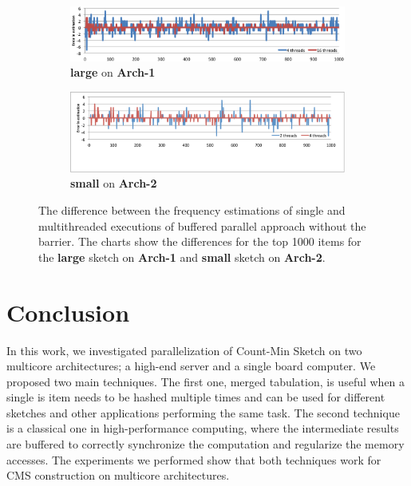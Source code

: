 \documentclass[10pt, conference, compsocconf]{IEEEtran}
\begin{document}
\begin{figure}[htbp]
\begin{center}
\begin{subfigure}[t]{\textwidth}
\includegraphics[width=\linewidth]{error1.png}
\caption{{\bf large} on {\bf Arch-1}}
\label{fig:err1}
\end{subfigure}
\end{center}

\begin{center}
\begin{subfigure}[t]{\textwidth}
\includegraphics[width=\linewidth]{error2.pdf}
\caption{{\bf small} on {\bf Arch-2}}
\label{fig:err2}
\end{subfigure}
\end{center}

\caption{The difference between the frequency estimations of single and multithreaded executions of buffered parallel approach without the barrier. The charts show the differences for the top 1000 items for the {\bf large} sketch on {\bf Arch-1} and {\bf small} sketch on {\bf Arch-2}.}
\label{fig:err}
\end{figure}



\section{Conclusion}\label{sec:con}

In this work, we investigated parallelization of Count-Min Sketch on two multicore architectures; a high-end server and a single board computer. We proposed two main techniques. The first one, merged tabulation, is useful when a single is item needs to be hashed multiple times and can be used for different sketches and other applications performing the same task. The second technique is a classical one in high-performance computing, where the intermediate results are buffered to correctly synchronize the computation and regularize the memory accesses. The experiments we performed show that both techniques work for CMS construction on multicore architectures.
\end{document}
